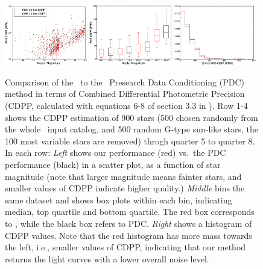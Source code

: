 \begin{figure}[p]
\begin{center}
\includegraphics[width=0.32\textwidth]{figures/cpm/f6j}
\includegraphics[width=0.32\textwidth]{figures/cpm/f6k}
\includegraphics[width=0.32\textwidth]{figures/cpm/f6l}
\end{center}
\caption[The \name\ photometric precisson]{
  \label{cdpp} 
  Comparison of the \name\ to the \Kepler\ Presearch Data Conditioning (PDC) method in terms of Combined Differential Photometric Precision (CDPP, calculated with equations 6-8 of section 3.3 in \citealt{cdpp1}).
  Row 1-4 shows the CDPP estimation of 900 stars (500 chosen randomly from the whole \Kepler\ input catalog, and 500 random G-type sun-like stars, the 100 most variable stars are removed) throgh quarter 5 to quarter 8. In each row:
  \emph{Left} shows our performance (red) vs.\ the PDC performance (black) in a scatter plot, as a function of star magnitude (note that larger magnitude means fainter stars, and smaller values of CDPP indicate higher quality.)
  \emph{Middle} bins the same dataset and shows box plots within each bin, indicating median, top quartile and bottom quartile. 
  The red box corresponds to \name, while the black box refers to PDC. 
  \emph{Right} shows a histogram of CDPP values. 
  Note that the red histogram has more mass towards the left, i.e., smaller values of CDPP, 
    indicating that our method returns the light curves with a lower overall noise level.
}
\end{figure}

